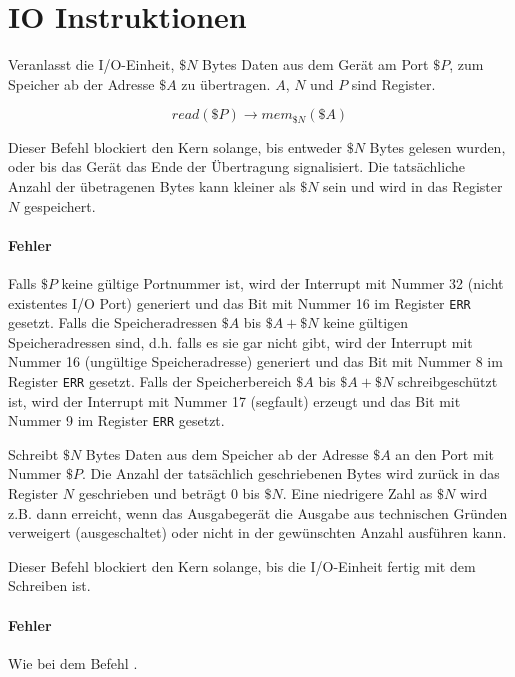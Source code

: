 \section{IO Instruktionen}
\label{sec:IO-Instruktionen}




Veranlasst die I/O-Einheit, $\$N$ Bytes Daten aus dem Gerät am Port $\$P$, zum
Speicher ab der Adresse $\$A$ zu übertragen. $A$, $N$ und $P$ sind Register.

\[
  read(\$P) \to mem_{\$N}(\$A)
\]

Dieser Befehl blockiert den Kern solange, bis entweder $\$N$ Bytes gelesen
wurden, oder bis das Gerät das Ende der Übertragung signalisiert. Die
tatsächliche Anzahl der übetragenen Bytes kann kleiner als $\$N$ sein und wird
in das Register $N$ gespeichert.


\paragraph{Fehler}
Falls $\$P$ keine gültige Portnummer ist, wird der Interrupt mit Nummer 32
(nicht existentes I/O Port) generiert und das Bit mit Nummer 16 im Register
\texttt{ERR} gesetzt. Falls die Speicheradressen $\$A$ bis $\$A + \$N$ keine
gültigen Speicheradressen sind, d.h. falls es sie gar nicht gibt, wird der
Interrupt mit Nummer 16 (ungültige Speicheradresse) generiert und das Bit mit
Nummer 8 im Register \texttt{ERR} gesetzt. Falls der Speicherbereich $\$A$ bis
$\$A + \$N$ schreibgeschützt ist, wird der Interrupt mit Nummer 17 (segfault)
erzeugt und das Bit mit Nummer 9 im Register \texttt{ERR} gesetzt.


Schreibt $\$N$ Bytes Daten aus dem Speicher ab der Adresse $\$A$ an den Port mit
Nummer $\$P$. Die Anzahl der tatsächlich geschriebenen Bytes wird zurück in das
Register $N$ geschrieben und beträgt $0$ bis $\$N$. Eine niedrigere Zahl
as $\$N$ wird z.B. dann erreicht, wenn das Ausgabegerät die Ausgabe aus
technischen Gründen verweigert (ausgeschaltet) oder nicht in der gewünschten
Anzahl ausführen kann.

Dieser Befehl blockiert den Kern solange, bis die I/O-Einheit fertig mit dem
Schreiben ist.

\paragraph{Fehler}
Wie bei dem Befehl .


